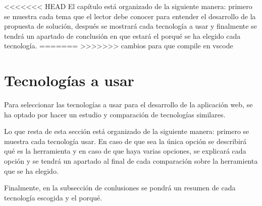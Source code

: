 <<<<<<< HEAD
El capítulo está organizado de la siguiente manera: primero se muestra cada tema que el lector debe conocer para entender el desarrollo de la propuesta de solución, después se mostrará cada tecnología a usar y finalmente se tendrá un apartado de conclusión en que estará el porqué se ha elegido cada tecnología.
=======
>>>>>>> cambios para que compile en vscode


 
 

 
%






\section{Tecnologías a usar}
Para seleccionar las tecnologías a usar para el desarrollo de la aplicación web, se ha optado por hacer un estudio y comparación de tecnologías similares.


Lo que resta de esta sección está organizado de la siguiente manera: primero se muestra cada tecnología usar. En caso de que sea la única opción se describirá qué es la herramienta y en caso de que haya varias opciones, se explicará cada opción y se tendrá un apartado al final de cada comparación sobre la herramienta que se ha elegido.


Finalmente, en la subsección de conlusiones se pondrá un resumen de cada tecnología escogida y el porqué.










